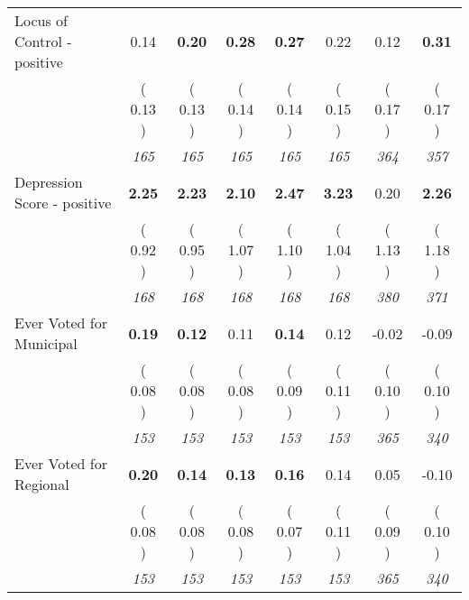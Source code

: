 \begin{tabular}{l c c c c c c c}
Locus of Control - positive &      0.14 & \textbf{      0.20 } & \textbf{      0.28 } & \textbf{     0.27} &      0.22 &      0.12 & \textbf{      0.31 } \\
& (     0.13 ) & (     0.13 ) & (     0.14 ) & (     0.14 ) & (     0.15 ) & (     0.17 ) & (     0.17 ) \\
& \textit{ 165 } & \textit{ 165 } & \textit{ 165 } & \textit{ 165 } & \textit{ 165 } & \textit{ 364 } & \textit{ 357 } \\
Depression Score - positive & \textbf{      2.25 } & \textbf{      2.23 } & \textbf{      2.10 } & \textbf{     2.47} & \textbf{     3.23} &      0.20 & \textbf{      2.26 } \\
& (     0.92 ) & (     0.95 ) & (     1.07 ) & (     1.10 ) & (     1.04 ) & (     1.13 ) & (     1.18 ) \\
& \textit{ 168 } & \textit{ 168 } & \textit{ 168 } & \textit{ 168 } & \textit{ 168 } & \textit{ 380 } & \textit{ 371 } \\
Ever Voted for Municipal & \textbf{      0.19 } & \textbf{      0.12 } &      0.11 & \textbf{     0.14} &      0.12 &     -0.02 &     -0.09 \\
& (     0.08 ) & (     0.08 ) & (     0.08 ) & (     0.09 ) & (     0.11 ) & (     0.10 ) & (     0.10 ) \\
& \textit{ 153 } & \textit{ 153 } & \textit{ 153 } & \textit{ 153 } & \textit{ 153 } & \textit{ 365 } & \textit{ 340 } \\
Ever Voted for Regional & \textbf{      0.20 } & \textbf{      0.14 } & \textbf{      0.13 } & \textbf{     0.16} &      0.14 &      0.05 &     -0.10 \\
& (     0.08 ) & (     0.08 ) & (     0.08 ) & (     0.07 ) & (     0.11 ) & (     0.09 ) & (     0.10 ) \\
& \textit{ 153 } & \textit{ 153 } & \textit{ 153 } & \textit{ 153 } & \textit{ 153 } & \textit{ 365 } & \textit{ 340 } \\
\bottomrule
\end{tabular}
